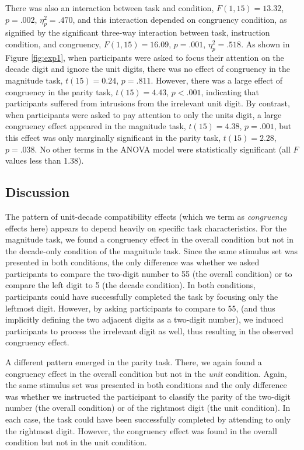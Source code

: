 \documentclass[english,man]{apa6}
\theoremstyle{definition}
\theoremstyle{definition}
\theoremstyle{definition}
\theoremstyle{remark}
\begin{document}
There was also an interaction between task and condition,
\(F(1, 15) = 13.32\), \(p = .002\), \(\eta^2_p = .470\), and this
interaction depended on congruency condition, as signified by the
significant three-way interaction between task, instruction condition,
and congruency, \(F(1, 15) = 16.09\), \(p = .001\), \(\eta^2_p = .518\).
As shown in Figure \ref{fig:exp1}, when participants were asked to focus
their attention on the decade digit and ignore the unit digits, there
was no effect of congruency in the magnitude task, \(t(15) = 0.24\),
\(p = .811\). However, there was a large effect of congruency in the
parity task, \(t(15) = 4.43\), \(p < .001\), indicating that
participants suffered from intrusions from the irrelevant unit digit. By
contrast, when participants were asked to pay attention to only the
units digit, a large congruency effect appeared in the magnitude task,
\(t(15) = 4.38\), \(p = .001\), but this effect was only marginally
significant in the parity task, \(t(15) = 2.28\), \(p = .038\). No other
terms in the ANOVA model were statistically significant (all \(F\)
values less than 1.38).

\subsection{Discussion}\label{discussion}

The pattern of unit-decade compatibility effects (which we term as
\emph{congruency} effects here) appears to depend heavily on specific
task characteristics. For the magnitude task, we found a congruency
effect in the overall condition but not in the decade-only condition of
the magnitude task. Since the same stimulus set was presented in both
conditions, the only difference was whether we asked participants to
compare the two-digit number to 55 (the overall condition) or to compare
the left digit to 5 (the decade condition). In both conditions,
participants could have successfully completed the task by focusing only
the leftmost digit. However, by asking participants to compare to 55,
(and thus implicitly defining the two adjacent digits as a two-digit
number), we induced participants to process the irrelevant digit as
well, thus resulting in the observed congruency effect.

A different pattern emerged in the parity task. There, we again found a
congruency effect in the overall condition but not in the \emph{unit}
condition. Again, the same stimulus set was presented in both conditions
and the only difference was whether we instructed the participant to
classify the parity of the two-digit number (the overall condition) or
of the rightmost digit (the unit condition). In each case, the task
could have been successfully completed by attending to only the
rightmost digit. However, the congruency effect was found in the overall
condition but not in the unit condition.
\end{document}
